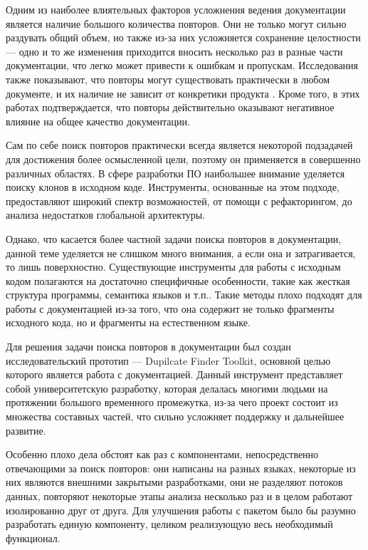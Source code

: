 \documentclass[14pt]{matmex-diploma-custom}
\begin{document}
Одним из наиболее влиятельных факторов усложнения ведения документации является наличие большого количества повторов. Они не только могут сильно раздувать общий объем, но также из-за них усложняется сохранение целостности --- одно и то же изменения приходится вносить несколько раз в разные части документации, что легко может привести к ошибкам и пропускам. Исследования также показывают, что повторы могут существовать практически в любом документе, и их наличие не зависит от конкретики продукта \cite{bib:art:JuergensCloneDetect, bib:art:DuplicatesStudy}. Кроме того, в этих работах подтверждается, что повторы действительно оказывают негативное влияние на общее качество документации.

Сам по себе поиск повторов практически всегда является некоторой подзадачей для достижения более осмысленной цели, поэтому он применяется в совершенно различных областях\cite{bib:art:NearDupSurvey}. В сфере разработки ПО наибольшее внимание уделяется поиску клонов в исходном коде\cite{bib:art:SoftwareClonesSurvey}. Инструменты, основанные на этом подходе, предоставляют широкий спектр возможностей, от помощи с рефакторингом, до анализа недостатков глобальной архитектуры.

Однако, что касается более частной задачи поиска повторов в документации, данной теме уделяется не слишком много внимания, а если она и затрагивается, то лишь поверхностно. Существующие инструменты для работы с исходным кодом полагаются на достаточно специфичные особенности, такие как жесткая структура программы, семантика языков и т.п.\cite{bib:tool:ASTSearch, bib:tool:ASTRefactor, bib:tool:ASTSuffix}. Такие методы плохо подходят для работы с документацией из-за того, что она содержит не только фрагменты исходного кода, но и фрагменты на естественном языке.

Для решения задачи поиска повторов в документации был создан исследовательский прототип --- Dupilcate Finder Toolkit\cite{bib:tool:DuplicateFinder}, основной целью которого является работа с документацией. Данный инструмент представляет собой университетскую разработку, которая делалась многими людьми на протяжении большого временного промежутка, из-за чего проект состоит из множества составных частей, что сильно усложняет поддержку и дальнейшее развитие.

Особенно плохо дела обстоят как раз с компонентами, непосредственно отвечающими за поиск повторов\cite{bib:tool:CloneMiner, bib:tool:FuzzySearch, bib:tool:ImprovedNgramSearch}: они написаны на разных языках, некоторые из них являются внешними закрытыми разработками, они не разделяют потоков данных, повторяют некоторые этапы анализа несколько раз и в целом работают изолированно друг от друга. Для улучшения работы с пакетом было бы разумно разработать единую компоненту, целиком реализующую весь необходимый функционал.
\end{document}
